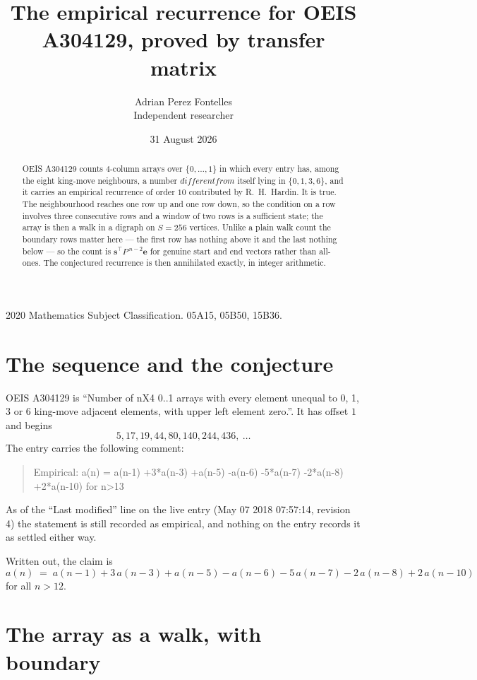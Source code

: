 \documentclass[11pt,a4paper]{article}
\title{The empirical recurrence for OEIS A304129, proved by transfer matrix}
\author{Adrian Perez Fontelles\\ \small Independent researcher}
\date{31 August 2026}
\theoremstyle{plain}
\theoremstyle{definition}
\begin{document}
\maketitle

\begin{abstract}
OEIS A304129 counts $4$-column arrays over $\{0,\dots,1\}$ in which every entry has,
among the eight king-move neighbours, a number $different from$ itself lying in $\{0,1,3,6\}$, and it carries an empirical
recurrence of order $10$ contributed by R.~H.~Hardin. It is true. The neighbourhood
reaches one row up and one row down, so the condition on a row involves three consecutive
rows and a window of two rows is a sufficient state; the array is then a walk in a digraph
on $S=256$ vertices. Unlike a plain walk count the boundary rows matter here --- the first
row has nothing above it and the last nothing below --- so the count is
$\mathbf{s}^{\!\top}P^{\,n-2}\mathbf{e}$ for genuine start and end vectors rather than
all-ones. The conjectured recurrence is then annihilated exactly, in integer arithmetic.
\end{abstract}

\noindent\small 2020 Mathematics Subject Classification. 05A15, 05B50, 15B36.\normalsize

\section{The sequence and the conjecture}

OEIS A304129 is ``Number of nX4 0..1 arrays with every element unequal to 0, 1, 3 or 6 king-move adjacent elements, with upper left element zero.''. It has offset
$1$ and begins
\[
5, 17, 19, 44, 80, 140, 244, 436,\ \dots
\]
The entry carries the following comment:
\begin{quote}\small
Empirical: a(n) = a(n-1) +3*a(n-3) +a(n-5) -a(n-6) -5*a(n-7) -2*a(n-8) +2*a(n-10) for n>13
\end{quote}
As of the ``Last modified'' line on the live entry (May 07 2018 07:57:14, revision
4) the statement is still recorded as empirical, and nothing on the entry
records it as settled either way.

Written out, the claim is
\begin{equation}\label{eq:conj}
a(n)\;=\;a(n-1) + 3\,a(n-3) + a(n-5) - a(n-6) - 5\,a(n-7) - 2\,a(n-8) + 2\,a(n-10)
\end{equation}
for all $n>12$.

\section{The array as a walk, with boundary}
\end{document}
